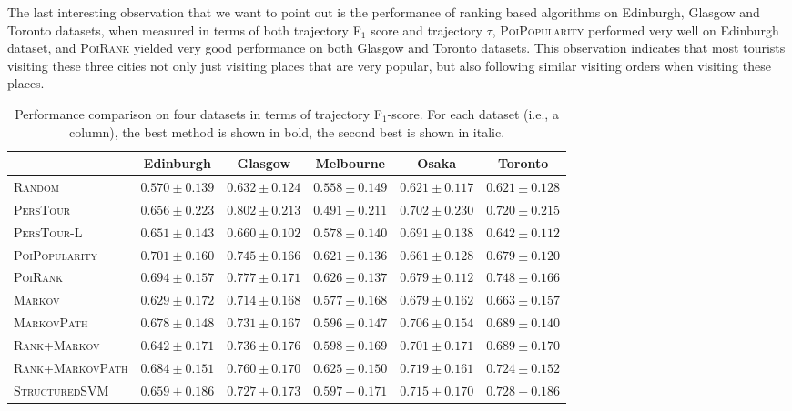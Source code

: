 % 
The last interesting observation that we want to point out is the performance of ranking based algorithms
on Edinburgh, Glasgow and Toronto datasets, when measured in terms of both trajectory F$_1$ score and trajectory
$\tau$, \textsc{PoiPopularity} performed very well on Edinburgh dataset, and \textsc{PoiRank} yielded very good
performance on both Glasgow and Toronto datasets.
This observation indicates that most tourists visiting these three cities not only just visiting
places that are very popular, but also following similar visiting orders when visiting these places.

\begin{table*}
\centering
\begin{tabular}{l|ccccc} \hline
 & Edinburgh & Glasgow & Melbourne & Osaka & Toronto \\ \hline
\textsc{Random} & $0.570\pm0.139$ & $0.632\pm0.124$ & $0.558\pm0.149$ & $0.621\pm0.117$ & $0.621\pm0.128$ \\
\textsc{PersTour}\cite{ijcai15} & $0.656\pm0.223$ & $\mathbf{0.802\pm0.213}$ & $0.491\pm0.211$ & $0.702\pm0.230$ & $0.720\pm0.215$ \\
\textsc{PersTour-L} & $0.651\pm0.143$ & $0.660\pm0.102$ & $0.578\pm0.140$ & $0.691\pm0.138$ & $0.642\pm0.112$ \\
\textsc{PoiPopularity} & $\mathbf{0.701\pm0.160}$ & $0.745\pm0.166$ & $0.621\pm0.136$ & $0.661\pm0.128$ & $0.679\pm0.120$ \\
\textsc{PoiRank} & $\mathit{0.694\pm0.157}$ & $\mathit{0.777\pm0.171}$ & $\mathbf{0.626\pm0.137}$ & $0.679\pm0.112$ & $\mathbf{0.748\pm0.166}$ \\
\textsc{Markov} & $0.629\pm0.172$ & $0.714\pm0.168$ & $0.577\pm0.168$ & $0.679\pm0.162$ & $0.663\pm0.157$ \\
\textsc{MarkovPath} & $0.678\pm0.148$ & $0.731\pm0.167$ & $0.596\pm0.147$ & $0.706\pm0.154$ & $0.689\pm0.140$ \\
\textsc{Rank+Markov} & $0.642\pm0.171$ & $0.736\pm0.176$ & $0.598\pm0.169$ & $0.701\pm0.171$ & $0.689\pm0.170$ \\
\textsc{Rank+MarkovPath} & $0.684\pm0.151$ & $0.760\pm0.170$ & $\mathit{0.625\pm0.150}$ & $\mathbf{0.719\pm0.161}$ & $0.724\pm0.152$ \\
\textsc{StructuredSVM} & $0.659\pm0.186$ & $0.727\pm0.173$ & $0.597\pm0.171$ & $\mathit{0.715\pm0.170}$ & $\mathit{0.728\pm0.186}$ \\
\hline
\end{tabular}
\caption{Performance comparison on four datasets in terms of trajectory F$_1$-score. 
         For each dataset (i.e., a column), the best method is shown in bold, the second best is shown in italic.}
\label{table:f1}
\end{table*}


